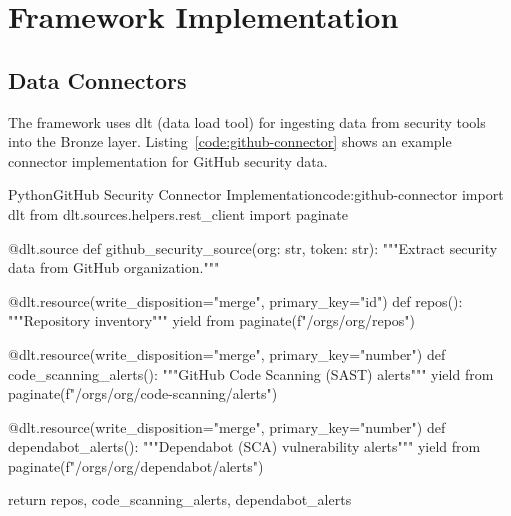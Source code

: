 \chapter{Framework Implementation}
\label{ch:framework-implementation}

\section{Data Connectors}

The framework uses dlt (data load tool) for ingesting data from security tools into the Bronze layer. Listing~\ref{code:github-connector} shows an example connector implementation for GitHub security data.

\begin{code}{Python}{GitHub Security Connector Implementation}{code:github-connector}
import dlt
from dlt.sources.helpers.rest_client import paginate

@dlt.source
def github_security_source(org: str, token: str):
    """Extract security data from GitHub organization."""

    @dlt.resource(write_disposition="merge", primary_key="id")
    def repos():
        """Repository inventory"""
        yield from paginate(f"/orgs/{org}/repos")

    @dlt.resource(write_disposition="merge", primary_key="number")
    def code_scanning_alerts():
        """GitHub Code Scanning (SAST) alerts"""
        yield from paginate(f"/orgs/{org}/code-scanning/alerts")

    @dlt.resource(write_disposition="merge", primary_key="number")
    def dependabot_alerts():
        """Dependabot (SCA) vulnerability alerts"""
        yield from paginate(f"/orgs/{org}/dependabot/alerts")

    return repos, code_scanning_alerts, dependabot_alerts
\end{code}
